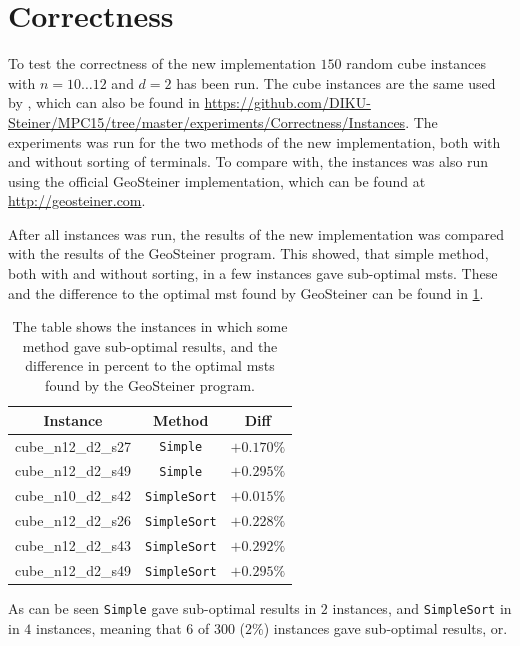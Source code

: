 \section{Correctness}
\label{sec:correctness}

To test the correctness of the new implementation $150$ random cube instances
with $n = 10 \ldots 12$ and $d = 2$ has been run. The cube instances are the
same used by \textcite{fonseca2014}, which can also be found in
\url{https://github.com/DIKU-Steiner/MPC15/tree/master/experiments/Correctness/Instances}. The
experiments was run for the two methods of the new implementation, both with and
without sorting of terminals. To compare with, the instances was also run using
the official GeoSteiner implementation, which can be found at
\url{http://geosteiner.com}.

After all instances was run, the results of the new implementation was compared
with the results of the GeoSteiner program. This showed, that simple method,
both with and without sorting, in a few instances gave sub-optimal
\acp{mst}. These and the difference to the optimal \ac{mst} found by GeoSteiner
can be found in \cref{tab:correctness-errors}.
%
\begin{table}[htbp]
  \centering
  \begin{tabular}{ccc}
    \toprule
    Instance           & Method              & Diff       \\
    \midrule
    cube\_n12\_d2\_s27 & \texttt{Simple}     & $+0.170\%$ \\
    cube\_n12\_d2\_s49 & \texttt{Simple}     & $+0.295\%$ \\
    cube\_n10\_d2\_s42 & \texttt{SimpleSort} & $+0.015\%$ \\
    cube\_n12\_d2\_s26 & \texttt{SimpleSort} & $+0.228\%$ \\
    cube\_n12\_d2\_s43 & \texttt{SimpleSort} & $+0.292\%$ \\
    cube\_n12\_d2\_s49 & \texttt{SimpleSort} & $+0.295\%$ \\
    \bottomrule
  \end{tabular}
  \caption[Suboptimal \acsp{mst} in correctness test]{The table shows the
    instances in which some method gave sub-optimal results, and the difference
    in percent to the optimal \acp{mst} found by the GeoSteiner
    program.\label{tab:correctness-errors}}
\end{table}
%
As can be seen \texttt{Simple} gave sub-optimal results in $2$ instances, and
\texttt{SimpleSort} in in $4$ instances, meaning that $6$ of $300$ ($2\%$) instances
gave sub-optimal results, or.

